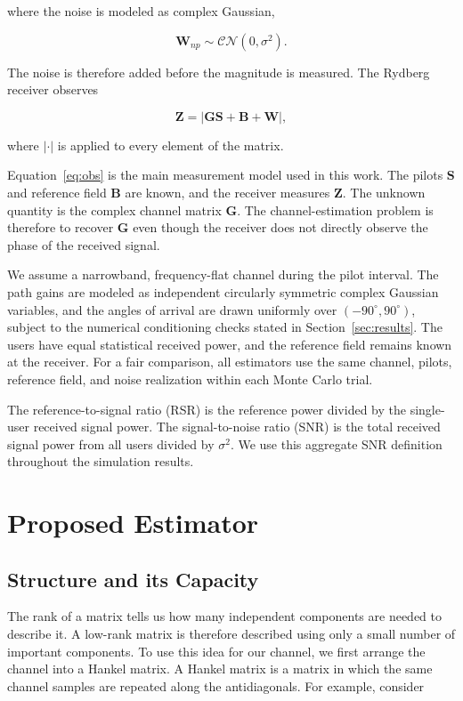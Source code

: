 \documentclass[journal]{IEEEtran}
\newcommand{\bG}{\mathbf{G}}
\newcommand{\bS}{\mathbf{S}}
\newcommand{\bB}{\mathbf{B}}
\newcommand{\bW}{\mathbf{W}}
\newcommand{\bZ}{\mathbf{Z}}
\newcommand{\CN}{\mathcal{CN}}
\begin{document}
where the noise is modeled as complex Gaussian,

\begin{equation}
\bW_{np}
\sim
\CN(0,\sigma^2).
\end{equation}

The noise is therefore added before the magnitude is measured. The Rydberg
receiver observes

\begin{equation}
\bZ
=
\left|
\bG\bS+\bB+\bW
\right|,
\label{eq:obs}
\end{equation}

where $|\cdot|$ is applied to every element of the matrix.

Equation~\eqref{eq:obs} is the main measurement model used in this work.
The pilots $\bS$ and reference field $\bB$ are known, and the receiver
measures $\bZ$. The unknown quantity is the complex channel matrix $\bG$.
The channel-estimation problem is therefore to recover $\bG$ even though
the receiver does not directly observe the phase of the received signal.

We assume a narrowband, frequency-flat channel during the pilot interval.
The path gains are modeled as independent circularly symmetric complex
Gaussian variables, and the angles of arrival are drawn uniformly over
$(-90^\circ,90^\circ)$, subject to the numerical conditioning checks
stated in Section~\ref{sec:results}. The users have equal statistical
received power, and the
reference field remains known at the receiver. For a fair comparison, all
estimators use the same channel, pilots, reference field, and noise
realization within each Monte Carlo trial.

The reference-to-signal ratio (RSR) is the reference power divided by
the single-user received signal power. The signal-to-noise ratio (SNR)
is the total received signal power from all users divided by
$\sigma^2$. We use this aggregate SNR definition throughout the
simulation results.


\section{Proposed Estimator}
\label{sec:method}

\subsection{Structure and its Capacity}

The rank of a matrix tells us how many independent components are needed
to describe it. A low-rank matrix is therefore described using only a
small number of important components. To use this idea for our channel,
we first arrange the channel into a Hankel matrix. A Hankel matrix is a
matrix in which the same channel samples are repeated along the
antidiagonals. For example, consider
\end{document}
